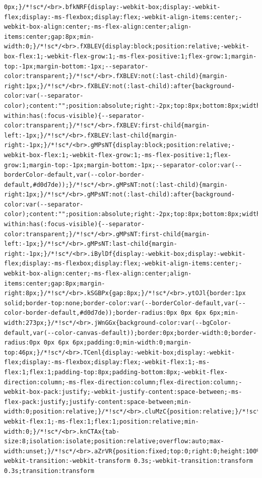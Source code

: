 \documentclass[
  letterpaper,
]{book}
\begin{document}
\begin{verbatim}
0px;}/*!sc*/<br>.bfkNRF{display:-webkit-box;display:-webkit-flex;display:-ms-flexbox;display:flex;-webkit-align-items:center;-webkit-box-align:center;-ms-flex-align:center;align-items:center;gap:8px;min-width:0;}/*!sc*/<br>.fXBLEV{display:block;position:relative;-webkit-box-flex:1;-webkit-flex-grow:1;-ms-flex-positive:1;flex-grow:1;margin-top:-1px;margin-bottom:-1px;--separator-color:transparent;}/*!sc*/<br>.fXBLEV:not(:last-child){margin-right:1px;}/*!sc*/<br>.fXBLEV:not(:last-child):after{background-color:var(--separator-color);content:"";position:absolute;right:-2px;top:8px;bottom:8px;width:1px;}/*!sc*/<br>.fXBLEV:focus-within:has(:focus-visible){--separator-color:transparent;}/*!sc*/<br>.fXBLEV:first-child{margin-left:-1px;}/*!sc*/<br>.fXBLEV:last-child{margin-right:-1px;}/*!sc*/<br>.gMPsNT{display:block;position:relative;-webkit-box-flex:1;-webkit-flex-grow:1;-ms-flex-positive:1;flex-grow:1;margin-top:-1px;margin-bottom:-1px;--separator-color:var(--borderColor-default,var(--color-border-default,#d0d7de));}/*!sc*/<br>.gMPsNT:not(:last-child){margin-right:1px;}/*!sc*/<br>.gMPsNT:not(:last-child):after{background-color:var(--separator-color);content:"";position:absolute;right:-2px;top:8px;bottom:8px;width:1px;}/*!sc*/<br>.gMPsNT:focus-within:has(:focus-visible){--separator-color:transparent;}/*!sc*/<br>.gMPsNT:first-child{margin-left:-1px;}/*!sc*/<br>.gMPsNT:last-child{margin-right:-1px;}/*!sc*/<br>.iBylDf{display:-webkit-box;display:-webkit-flex;display:-ms-flexbox;display:flex;-webkit-align-items:center;-webkit-box-align:center;-ms-flex-align:center;align-items:center;gap:8px;margin-right:8px;}/*!sc*/<br>.kSGBPx{gap:8px;}/*!sc*/<br>.ytOJl{border:1px solid;border-top:none;border-color:var(--borderColor-default,var(--color-border-default,#d0d7de));border-radius:0px 0px 6px 6px;min-width:273px;}/*!sc*/<br>.jWnGGx{background-color:var(--bgColor-default,var(--color-canvas-default));border:0px;border-width:0;border-radius:0px 0px 6px 6px;padding:0;min-width:0;margin-top:46px;}/*!sc*/<br>.TCenl{display:-webkit-box;display:-webkit-flex;display:-ms-flexbox;display:flex;-webkit-flex:1;-ms-flex:1;flex:1;padding-top:8px;padding-bottom:8px;-webkit-flex-direction:column;-ms-flex-direction:column;flex-direction:column;-webkit-box-pack:justify;-webkit-justify-content:space-between;-ms-flex-pack:justify;justify-content:space-between;min-width:0;position:relative;}/*!sc*/<br>.cluMzC{position:relative;}/*!sc*/<br>.eRkHwF{-webkit-flex:1;-ms-flex:1;flex:1;position:relative;min-width:0;}/*!sc*/<br>.knCTAx{tab-size:8;isolation:isolate;position:relative;overflow:auto;max-width:unset;}/*!sc*/<br>.aZrVR{position:fixed;top:0;right:0;height:100%;width:15px;-webkit-transition:-webkit-transform 0.3s;-webkit-transition:transform 0.3s;transition:transform 
\end{verbatim}
\end{document}

